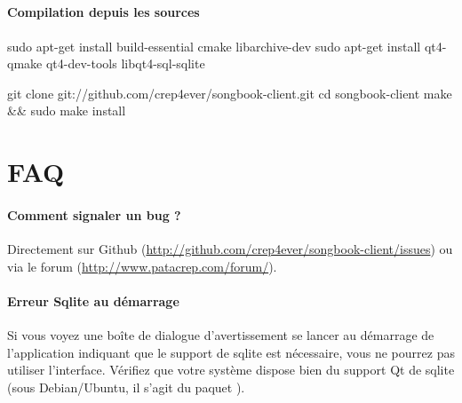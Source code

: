 \subsection{\linux}

\paragraph{Compilation depuis les sources}

\begin{unix}
  sudo apt-get install build-essential cmake libarchive-dev
  sudo apt-get install qt4-qmake qt4-dev-tools libqt4-sql-sqlite
\end{unix}

\begin{unix}
  git clone git://github.com/crep4ever/songbook-client.git
  cd songbook-client
  make && sudo make install
\end{unix}

\subsection{\windows}


\section{FAQ}

\paragraph{Comment signaler un bug ?}
Directement sur Github
(\url{http://github.com/crep4ever/songbook-client/issues}) ou via le
forum (\url{http://www.patacrep.com/forum/}).

\paragraph{Erreur Sqlite au démarrage} 
Si vous voyez une boîte de dialogue d'avertissement se lancer au
démarrage de l'application indiquant que le support de sqlite est
nécessaire, vous ne pourrez pas utiliser l'interface. Vérifiez que
votre système dispose bien du support Qt de sqlite (sous
Debian/Ubuntu, il s'agit du paquet ).

